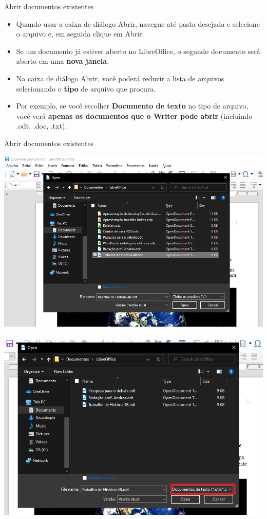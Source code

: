 \begin{frame}{Abrir documentos existentes}
	\begin{block}{}
		\begin{itemize}
			\item Quando usar a caixa de diálogo Abrir, navegue até pasta desejada e selecione o arquivo e, em seguida clique em Abrir.
			\item Se um documento já estiver aberto no LibreOffice, o segundo documento será aberto em uma \textbf{nova janela}.
			\item Na caixa de diálogo Abrir, você poderá reduzir a lista de arquivos selecionando o \textbf{tipo} de arquivo que procura.
			\item Por exemplo, se você escolher \textbf{Documento de texto} no tipo de arquivo, você verá \textbf{apenas os documentos que o Writer pode abrir} (incluindo .odt, .doc, .txt).
		\end{itemize}
	\end{block}
\end{frame}


\begin{frame}{Abrir documentos existentes}
	\begin{minipage}{0.49\linewidth}
		\centering
		\includegraphics[width=1\linewidth]{Figuras/Ch04/fig32}
	\end{minipage}\hfill
	\begin{minipage}{0.49\linewidth}
		\centering
		\includegraphics[width=1\linewidth]{Figuras/Ch04/fig33}
	\end{minipage}
\end{frame}


